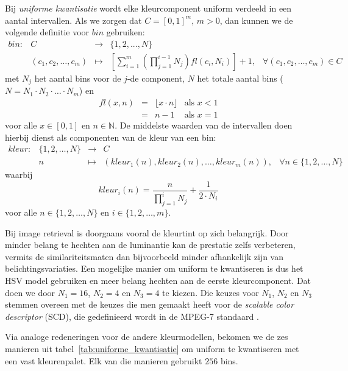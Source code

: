 Bij \emph{uniforme kwantisatie} wordt elke kleurcomponent uniform verdeeld in een 
aantal intervallen. Als we zorgen dat $C=[0,1]^m$, $m > 0$, dan kunnen we de 
volgende definitie voor $bin$ gebruiken: $$
\begin{array}{lrcll}
bin: & C & \to & \{1,2,...,N\}\\[5pt] & (c_1,c_2,\ldots,c_m) & \mapsto & \left[ 
\sum_{i=1}^m \left( \prod_{j=1}^{i-1} N_j \right) \mathit{fl}(c_i, N_i) \right] 
+ 1, & \forall (c_1,c_2,\ldots,c_m) \in C
\end{array}
$$ met $N_j$ het aantal bins voor de $j$-de component, $N$ het totale aantal 
bins ($N=N_1 \cdot N_2 \cdot \ldots \cdot N_m$) en $$
\begin{array}{rcll}
\mathit{fl}(x,n) & = & \lfloor x \cdot n \rfloor & \textrm{als } x < 1 \\ & = & 
n - 1 & \textrm{als } x = 1
\end{array}
$$ voor alle $x \in [0,1]$ en $n \in \mathbb{N}$. De middelste waarden van de 
intervallen doen hierbij dienst als componenten van de kleur van een bin: $$
\begin{array}{lrcll}
kleur: & \{1,2,\ldots,N\} & \to & C \\ & n & \mapsto & (kleur_1(n), kleur_2(n), 
\dots, kleur_m(n)), & \forall n \in \{1,2,\ldots,N\}
\end{array}
$$ waarbij $$ kleur_i(n) = \frac{n}{\prod_{j=1}^i N_j} + \frac{1}{2 \cdot N_i} 
$$ voor alle $n \in \{1,2,\ldots,N\}$ en $i \in \{1,2,\ldots,m\}$.

Bij image retrieval is doorgaans vooral de kleurtint op zich belangrijk. Door
minder belang te hechten aan de luminantie kan de prestatie zelfs verbeteren,
vermits de similariteitsmaten dan bijvoorbeeld minder afhankelijk zijn van
belichtingsvariaties. Een mogelijke manier om uniform te kwantiseren is dus
het HSV model gebruiken en meer belang hechten aan de eerste kleurcomponent. 
Dat doen we door $N_1=16$, $N_2=4$ en $N_3=4$ te kiezen.
Die keuzes voor $N_1$, $N_2$ en $N_3$ stemmen overeen met de keuzes die men 
gemaakt heeft voor de \emph{scalable color descriptor} (SCD), die gedefinieerd 
wordt in de MPEG-7 standaard \cite{manjunath:color_and_texture_descriptors}.

Via analoge redeneringen voor de andere kleurmodellen, bekomen we de zes manieren 
uit tabel~\ref{tab:uniforme_kwantisatie} om uniform te kwantiseren met een vast kleurenpalet.
Elk van die manieren gebruikt $256$ bins.

